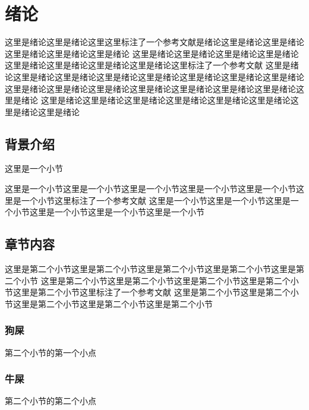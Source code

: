 \section{绪论}

这里是绪论这里是绪论这里\cite{02-na-va-raman-sphere}这里标注了一个参考文献是绪论这里是绪论这里是绪论这里是绪论这里是绪论这里是绪论
这里是绪论这里是绪论这里是绪论这里是绪论这里是绪论这里是绪论这里是绪论这里是绪论\cite{00-prl-va-critical-coup}这里标注了一个参考文献
这里是绪论这里是绪论这里是绪论这里是绪论这里是绪论这里是绪论这里是绪论这里是绪论
这里是绪论这里是绪论这里是绪论这里是绪论这里是绪论这里是绪论这里是绪论这里是绪论
这里是绪论这里是绪论这里是绪论这里是绪论这里是绪论这里是绪论这里是绪论这里是绪论

\subsection{背景介绍}
这里是一个小节


这里是一个小节这里是一个小节这里是一个小节这里是一个小节这里是一个小节这里是一个小节\cite{04-kippenger-thesis}这里标注了一个参考文献
这里是一个小节这里是一个小节这里是一个小节这里是一个小节这里是一个小节这里是一个小节

\subsection{章节内容}

这里是第二个小节这里是第二个小节这里是第二个小节这里是第二个小节这里是第二个小节
这里是第二个小节这里是第二个小节这里是第二个小节这里是第二个小节这里是第二个小节\cite{04-prl-va-kerr-opo-raman}这里标注了一个参考文献
这里是第二个小节这里是第二个小节这里是第二个小节这里是第二个小节这里是第二个小节

\subsubsection{狗屎}

第二个小节的第一个小点

\subsubsection{牛屎}

第二个小节的第二个小点 

